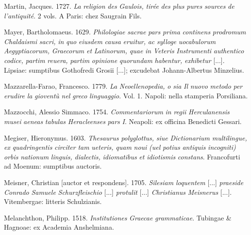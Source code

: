 Martin, Jacques. 1727. \textit{La} \textit{religion} \textit{des} \textit{Gaulois,} \textit{tirée} \textit{des} \textit{plus} \textit{pures} \textit{sources} \textit{de} \textit{l’antiquité}. 2 vols. A Paris: chez Saugrain Fils.

Mayer, Bartholomaeus. 1629. \textit{Philologiae} \textit{sacrae} \textit{pars} \textit{prima} \textit{continens} \textit{prodromum} \textit{Chaldaismi} \textit{sacri,} \textit{in} \textit{quo} \textit{eiusdem} \textit{causa} \textit{eruitur,} \textit{ac} \textit{sylloge} \textit{uocabulorum} \textit{Aegyptiacorum,} \textit{Graecorum} \textit{et} \textit{Latinorum,} \textit{quae} \textit{in} \textit{Veteris} \textit{Instrumenti} \textit{authentico} \textit{codice,} \textit{partim} \textit{reuera,} \textit{partim} \textit{opinione} \textit{quorundam} \textit{habentur,} \textit{exhibetur} [...]. Lipsiae: sumptibus Gothofredi Grosii [...]; excudebat Johann-Albertus Minzelius.

Mazzarella-Farao, Francesco. 1779. \textit{La} \textit{Neoellenopedia,} \textit{o} \textit{sia} \textit{Il} \textit{nuovo} \textit{metodo} \textit{per} \textit{erudire} \textit{la} \textit{gioventù} \textit{nel} \textit{greco} \textit{linguaggio}. Vol. 1. Napoli: nella stamperia Porsiliana.

Mazzocchi, Alessio Simmaco. 1754. \textit{Commentariorum} \textit{in} \textit{regii} \textit{Herculanensis} \textit{musei} \textit{aeneas} \textit{tabulas} \textit{Heracleenses} \textit{pars} \textit{I}. Neapoli: ex officina Benedicti Gessari.

Megiser, Hieronymus. 1603. \textit{Thesaurus} \textit{polyglottus,} \textit{siue} \textit{Dictionarium} \textit{multilingue,} \textit{ex} \textit{quadringentis} \textit{circiter} \textit{tam} \textit{ueteris,} \textit{quam} \textit{noui} \textit{(uel} \textit{potius} \textit{antiquis} \textit{incogniti)} \textit{orbis} \textit{nationum} \textit{linguis,} \textit{dialectis,} \textit{idiomatibus} \textit{et} \textit{idiotismis} \textit{constans}. Francofurti ad Moenum: sumptibus auctoris.

Meisner, Christian [auctor et respondens]. 1705. \textit{Silesiam} \textit{loquentem} [...] \textit{praeside} \textit{Conrado} \textit{Samuele} \textit{Schurzfleischio} [...] \textit{protulit} [...] \textit{Christianus} \textit{Meisnerus} [...]. Vitembergae: litteris Schulzianis.

Melanchthon, Philipp. 1518. \textit{Institutiones} \textit{Graecae} \textit{grammaticae}. Tubingae \& Hagnoae: ex Academia Anshelmiana.

